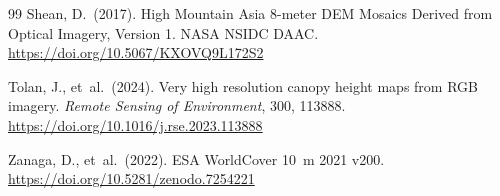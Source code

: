 \documentclass[11pt]{article}
\begin{document}
\begin{thebibliography}{99}
Shean, D.\ (2017).
High Mountain Asia 8-meter DEM Mosaics Derived from Optical Imagery, Version 1.
NASA NSIDC DAAC.
\url{https://doi.org/10.5067/KXOVQ9L172S2}

Tolan, J., et~al.\ (2024).
Very high resolution canopy height maps from RGB imagery.
\textit{Remote Sensing of Environment}, 300, 113888.
\url{https://doi.org/10.1016/j.rse.2023.113888}

Zanaga, D., et~al.\ (2022).
ESA WorldCover 10~m 2021 v200.
\url{https://doi.org/10.5281/zenodo.7254221}
\end{thebibliography}
\end{document}

